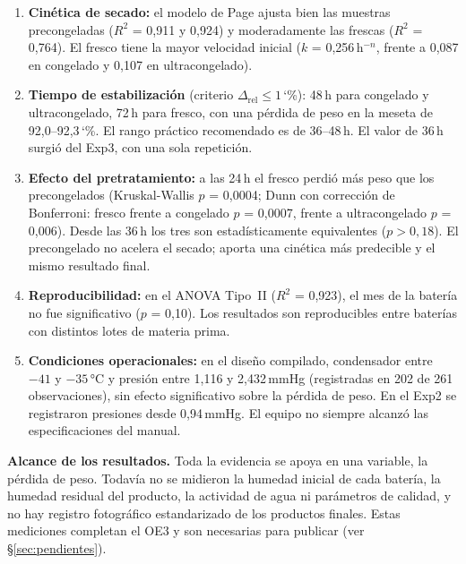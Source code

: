 \documentclass[12pt, a4paper]{article}
\newcommand{\porconf}[1]{\textcolor{orange!85!black}{#1}}
\newcommand{\pct}{\char`\%}
\begin{document}
\begin{enumerate}[nosep]
    \item \textbf{Cinética de secado:} el modelo de Page ajusta bien las muestras precongeladas ($R^2$ = \porconf{0,911} y \porconf{0,924}) y moderadamente las frescas ($R^2$ = \porconf{0,764}). El fresco tiene la mayor velocidad inicial ($k$ = \porconf{0,256}\,h$^{-n}$, frente a \porconf{0,087} en congelado y \porconf{0,107} en ultracongelado).

    \item \textbf{Tiempo de estabilización} (criterio $\Delta_{\mathrm{rel}} \leq 1$\,\pct{}): 48\,h para congelado y ultracongelado, 72\,h para fresco, con una pérdida de peso en la meseta de \porconf{92,0--92,3\,\pct{}}. El rango práctico recomendado es de 36--48\,h. El valor de 36\,h surgió del Exp3, con una sola repetición.

    \item \textbf{Efecto del pretratamiento:} a las 24\,h el fresco perdió más peso que los precongelados (Kruskal-Wallis $p$ = \porconf{0,0004}; Dunn con corrección de Bonferroni: fresco frente a congelado $p$ = \porconf{0,0007}, frente a ultracongelado $p$ = \porconf{0,006}). Desde las 36\,h los tres son estadísticamente equivalentes ($p > 0{,}18$). El precongelado no acelera el secado; aporta una cinética más predecible y el mismo resultado final.

    \item \textbf{Reproducibilidad:} en el ANOVA Tipo~II ($R^2$ = \porconf{0,923}), el mes de la batería no fue significativo ($p$ = \porconf{0,10}). Los resultados son reproducibles entre baterías con distintos lotes de materia prima.

    \item \textbf{Condiciones operacionales:} en el diseño compilado, condensador entre $-41$ y $-35$\,°C y presión entre 1,116 y 2,432\,mmHg (registradas en 202 de 261 observaciones), sin efecto significativo sobre la pérdida de peso. En el Exp2 se registraron presiones desde 0,94\,mmHg. El equipo no siempre alcanzó las especificaciones del manual.
\end{enumerate}

\textbf{Alcance de los resultados.} Toda la evidencia se apoya en una variable, la pérdida de peso. Todavía no se midieron la humedad inicial de cada batería, la humedad residual del producto, la actividad de agua ni parámetros de calidad, y no hay registro fotográfico estandarizado de los productos finales. Estas mediciones completan el OE3 y son necesarias para publicar (ver §\ref{sec:pendientes}).
\end{document}
